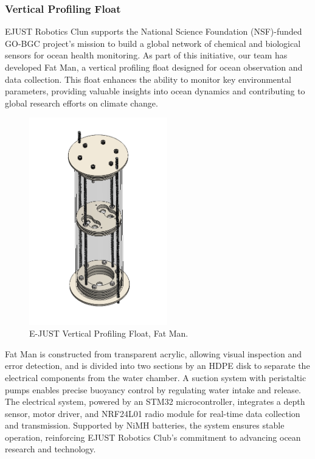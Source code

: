 \subsubsection{Vertical Profiling Float}

EJUST Robotics Clun supports the National Science Foundation (NSF)-funded GO-BGC project’s mission to build a global network of chemical and biological sensors for ocean health monitoring. As part of this initiative, our team has developed Fat Man, a vertical profiling float designed for ocean observation and data collection. This float enhances the ability to monitor key environmental parameters, providing valuable insights into ocean dynamics and contributing to global research efforts on climate change.

\begin{figure}[h]
    \centering
    \includegraphics[height=9cm]{Sections/2Design Rationale/images/float.png}
    \caption{E-JUST Vertical Profiling Float, Fat Man.}
    \label{fig:Float}
\end{figure}

\vspace{-0.3cm}
Fat Man is constructed from transparent acrylic, allowing visual inspection and error detection, and is divided into two sections by an HDPE disk to separate the electrical components from the water chamber. A suction system with peristaltic pumps enables precise buoyancy control by regulating water intake and release. The electrical system, powered by an STM32 microcontroller, integrates a depth sensor, motor driver, and NRF24L01 radio module for real-time data collection and transmission. Supported by NiMH batteries, the system ensures stable operation, reinforcing EJUST Robotics Club's commitment to advancing ocean research and technology.